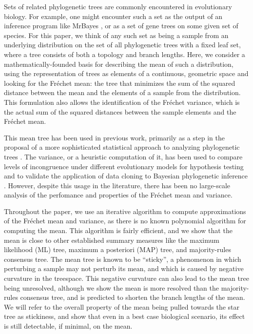 \documentclass[12pt,letterpaper]{article}
\theoremstyle{plain}
\theoremstyle{definition}
\begin{document}
\bigskip

Sets of related phylogenetic trees are commonly encountered in evolutionary biology.  For example, one might encounter such a set as the output of an inference program like MrBayes \citep{mrbayes}, or as a set of gene trees on some given set of species.  For this paper, we think of any such set as being a sample from an underlying distribution on the set of all phylogenetic trees with a fixed leaf set, where a tree consists of both a topology and branch lengths.  Here, we consider a mathematically-founded basis for describing the mean of such a distribution, using the representation of trees as elements of a continuous, geometric space and looking for the Fr\'echet mean: the tree that minimizes the sum of the squared distance between the mean and the elements of a sample from the distribution.  This formulation also allows the identification of the Fr\'echet variance, which is the actual sum of the squared distances between the sample elements and the Fr\'echet mean.  

This mean tree has been used in previous work, primarily as a step in the proposal of a more sophisticated statistical approach to analyzing phylogenetic trees \citep{willisConfidence, zairis2016genomic, NyeYoshidaEtal, NyePCA2}.  The variance, or a heuristic computation of it, has been used to compare levels of incongruence under different evolutionary models \citep{williams2012congruent} for hypothesis testing and to validate the application of data cloning to Bayesian phylogenetic inference \citep{PoncianoBurleighEtal}.  However, despite this usage in the literature, there has been no large-scale analysis of the perfomance and properties of the Fr\'echet mean and variance.  

Throughout the paper, we use an iterative algorithm to compute approximations of the Fr\'echet mean and variance, as there is no known polynomial algorithm for computing the mean. This algorithm is fairly efficient, and we show that the mean is close to other established summary measures like the maximum likelihood (ML) tree, maximum a posteriori (MAP) tree, and majority-rules consensus tree.  The mean tree is known to be ``sticky'', a phenomenon in which perturbing a sample may not perturb its mean, and which is caused by negative curvature in the treespace.  This negative curvature can also lead to the mean tree being unresolved, although we show the mean is more resolved than the majority-rules consensus tree, and is predicted to shorten the branch lengths of the mean.  We will refer to the overall property of the mean being pulled towards the star tree as stickiness, and show that even in a best case biological scenario, its effect is still detectable, if minimal, on the mean. 
\end{document}
